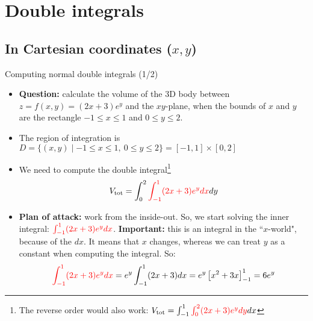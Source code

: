 \section{Double integrals}
\subsection{In Cartesian coordinates ($x,y$)}
\iffalse
\begin{frame}{Double integrals (intuition)}
    Sometimes we need to take an integral over a integral.
    This is useful for example when calculating the volume of a 3D body.
    \begin{itemize}
        \item \textbf{Question:} calculate the volume of the 3D body between $z=f(x,y)=(2x+3)e^y$ and the $xy$-plane, when the bounds of $x$ and $y$ are the rectangle $-1\leq x\leq1$ and $0\leq y\leq2$.
        \item \textbf{Intuition:} the volume consists of a large number of very small ``boxes'' (3D-rectangles). The volume of one such ``box" is $\text{length}\cdot\text{width}\cdot\text{height}=dx\cdot dy\cdot(2x+3)e^y$. The total volume of the 3D body must be the sum of all these little boxes, i.e., an integral:
            \[V_{\text{tot}}=\int_{0}^{2}\int_{-1}^{1}(2x+3)e^y dxdy=\int_{-1}^{1}\int_{0}^{2}(2x+3)e^y dydx\]
        The next slides cover how to compute such a double integral.
    \item    \textbf{Note:} in the case of a rectangle, the order of integration does not matter (that's why the two double integals above are equivalent).
    \end{itemize}
\end{frame}
\fi


\begin{frame}{Computing normal double integrals (1/2)}
    \footnotesize
    \begin{itemize}
        \item \textbf{Question:} calculate the volume of the 3D body between $z=f(x,y)=(2x+3)e^y$ and the $xy$-plane, when the bounds of $x$ and $y$ are the rectangle $-1\leq x\leq1$ and $0\leq y\leq2$.
        \item\pause The region of integration is $D=\{(x,y)\mid-1\leq x\leq1,~ 0\leq y\leq2\}=[-1,1]\times[0,2]$
        \item\pause We need to compute the double integral\footnote{The reverse order would also work:
            $V_{\text{tot}}=\int_{-1}^{1}\textcolor{red}{\int_{0}^{2}(2x+3)e^y dy}dx$}
            \[V_{\text{tot}}=\int_{0}^{2}\textcolor{red}{\int_{-1}^{1}(2x+3)e^y dx}dy\]
        \item\pause \textbf{Plan of attack:} work from the inside-out. So, we start solving the inner integral: $\textcolor{red}{\int_{-1}^{1}(2x+3)e^y dx}$. \textbf{Important:} this is an integral in the ``$x$-world", because of the $dx$. It means that $x$ changes, whereas we can treat $y$ as a constant when computing the integral. So:
            \[\textcolor{red}{\int_{-1}^{1}(2x+3)e^y dx}=e^y\int_{-1}^1(2x+3)dx=e^y\left[x^2+3x\right]_{-1}^1=6e^y\]
    \end{itemize}
\end{frame}

